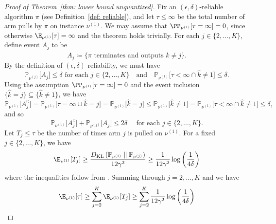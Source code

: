 \begin{proof}[Proof of Theorem~\ref{thm: lower bound unquantized}]
Fix an $(\epsilon, \delta)$-reliable algorithm $\pi$ (see Definition~\ref{def: reliable}), and let $\tau \le \infty$ be the total number of arm pulls by $\pi$ on instance $\nu^{(1)}$. We may assume that $\PP_{\nu^{(1)}}[\tau = \infty] = 0$, since otherwise $\E_{\nu^{(1)}}[\tau] = \infty$ and the theorem holds trivially.
For each $j \in \{2, \ldots, K\}$, define event $A_j$ to be 
\begin{equation}
    A_j \coloneqq \{ \pi \text{ terminates and outputs $\hat{k} \ne j$} \}.
\end{equation}
By the definition of $(\epsilon, \delta)$-reliability, we must have
\begin{equation}
    \mathbb{P}_{\nu^{(j)}}\big[A_j\big]
    \le \delta \text{ for each } j \in \{2, \ldots, K\}
    \quad \text{and} \quad
    \mathbb{P}_{\nu^{(1)}}\big[ \tau < \infty \cap   \hat{k} \ne 1 \big] \le \delta.
\end{equation}
    Using the assumption $\PP_{\nu^{(1)}}[\tau = \infty] = 0$ 
    and the event inclusion $\{\hat{k} = j\} \subseteq \{\hat{k} \ne 1\}$, we have
\begin{equation}
    \mathbb{P}_{\nu^{(1)}}\big[A_j^{\complement} \big] =
    \mathbb{P}_{\nu^{(1)}}\big[\tau = \infty \cup \hat{k} = j \big] =
    \mathbb{P}_{\nu^{(1)}}\big[\hat{k} = j \big]
    \le
    \mathbb{P}_{\nu^{(1)}}\big[\hat{k} \ne 1 \big] = 
    \mathbb{P}_{\nu^{(1)}}\big[ \tau < \infty \cap   \hat{k} \ne 1 \big] \le \delta,
\end{equation}
and so 
\begin{equation}
    \mathbb{P}_{\nu^{(1)}}\big[A_j^{\complement} \big] + 
 \mathbb{P}_{\nu^{(j)}}\big[A_j  \big] \le 2 \delta \quad 
 \text{ for each } j \in \{2, \ldots, K\}.
\end{equation}
Let $T_j \le \tau$ be the number of times arm $j$ is pulled on $\nu^{(1)}$. For a fixed $j \in \{2, \ldots, K\}$, we have
\begin{equation}
    \E_{\nu^{(1)}}[T_j]
    \ge 
    \frac{D_{\mathrm{KL}}
    \left(\mathbb{P}_{\nu^{(1)}} \parallel  \mathbb{P}_{\nu^{(j)}}\right)}{12 \gamma^2} 
    \ge
    \frac{1}{12 \gamma^2} \log \left( \frac{1}{4 \delta} \right) 
\end{equation}
where the inequalities follow from \cite[Eqn. 29--34]{nikolakakis2021quantile}.
Summing through $j  = 2, \ldots, K$
and 
we have
\begin{align}
    \E_{\nu^{(1)}}[\tau]
    \ge
    \sum_{j=2}^K \E_{\nu^{(1)}}[T_j] 
    \ge
    \sum_{j=2}^K  
    \frac{1}{12 \gamma^2} \log \left( \frac{1}{4 \delta} \right) 

\end{align}
\end{proof}
